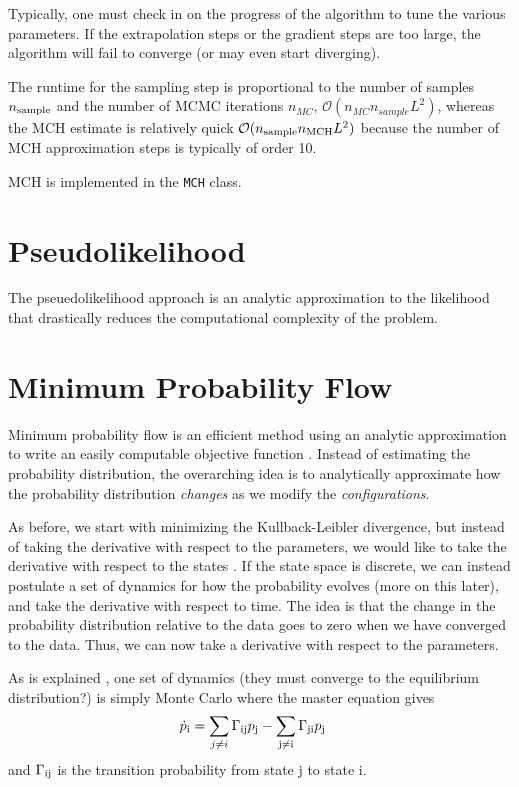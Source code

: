 \documentclass[aps,prl,twocolumn]{revtex4-1}
\begin{document}
Typically, one must check in on the progress of the algorithm to tune the various parameters. If the extrapolation steps or the gradient steps are too large, the algorithm will fail to converge (or may even start diverging).

The runtime for the sampling step is proportional to the number of samples $n_{\rm sample}$ and the number of MCMC iterations $n_{MC}$, $\mathcal{O}(n_{MC} n_{sample} L^2)$, whereas the MCH estimate is relatively quick $\mathcal{O}(n_{\rm sample}n_{\rm MCH}L^2)$ because the number of MCH approximation steps is typically of order 10.

MCH is implemented in the {\tt MCH} class.

\section{Pseudolikelihood}
The pseuedolikelihood approach is an analytic approximation to the likelihood that drastically reduces the computational complexity of the problem.

\section{Minimum Probability Flow}
Minimum probability flow is an efficient method using an analytic approximation to write an easily computable objective function \cite{SohlDickstein:2011im}. Instead of estimating the probability distribution, the overarching idea is to analytically approximate how the probability distribution \textit{changes} as we modify the \textit{configurations}.

As before, we start with minimizing the Kullback-Leibler divergence, but instead of taking the derivative with respect to the parameters, we would like to take the derivative with respect to the states \cite{Hyvärinen:2007ed}. If the state space is discrete, we can instead postulate a set of dynamics for how the probability evolves (more on this later), and take the derivative with respect to time. The idea is that  the change in the probability distribution relative to the data goes to zero when we have converged to the data. Thus, we can now take a derivative with respect to the parameters.

As is explained \cite{SohlDickstein:2011im}, one set of dynamics (they must converge to the equilibrium distribution?) is simply Monte Carlo where the master equation gives
\begin{align}
	\dot{p}_{\rm i} &= \sum_{j\neq i} \Gamma_{\rm ij} p_{\rm j} -\sum_{\rm j\neq i} \Gamma_{\rm ji} p_{\rm j}
\end{align}
and $\Gamma_{\rm ij}$ is the transition probability from state j to state i.
\end{document}
